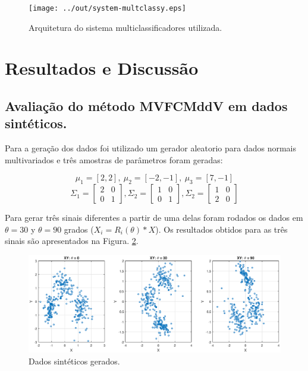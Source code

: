 \documentclass[12pt]{article}
\begin{document}
\begin{figure}[h]
\centering
\texttt{[image: ../out/system-multclassy.eps]}
\caption{Arquitetura do sistema multiclassificadores utilizada.}
\label{fig:mult_system_classy}
\end{figure}  






\section{Resultados e Discussão}\label{RD}

\subsection{Avaliação do método MVFCMddV em dados sintéticos.}
Para a geração dos dados foi utilizado um gerador aleatorio para dados normais multivariados e três amostras de parâmetros  foram geradas:

$$\mu_1 = [2, 2], \ \mu_2 = [-2, -1], \ \mu_3 = [7, -1] $$
$$\Sigma_1 = \left[ \begin{matrix}
2 & 0 \\ 
0 & 1
\end{matrix} \right], 
\Sigma_2 = \left[ \begin{matrix}
1 & 0 \\ 
0 & 1
\end{matrix} \right], 
\Sigma_2 = \left[ \begin{matrix}
1 & 0 \\ 
2 & 0
\end{matrix} \right] $$

Para gerar três sinais diferentes a partir de uma delas foram rodados os dados em $\theta = 30$ y $\theta = 90$ grados ($X_i = R_i(\theta)*X$). Os resultados obtidos para as três sinais são apresentados na Figura. \ref{fig:xy_sinteticos}.

\begin{figure}[h]
\centering
\includegraphics[width=4.5in]{../out/xy-sinteticos.eps}
\caption{Dados sintéticos gerados.}
\label{fig:xy_sinteticos}
\end{figure}  
\end{document}

